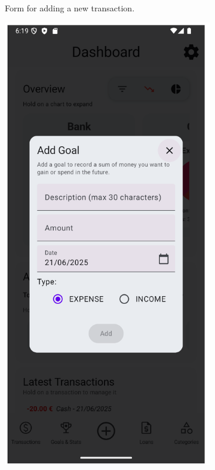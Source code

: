 \documentclass[a4paper,12pt]{article}
\begin{document}
\begin{figure}[H]
\begin{subfigure}[b]{0.23\textwidth}
        \caption{Form for adding a new transaction.}
        \label{fig:add_transaction_form}
    \end{subfigure}
    \hfill
    \begin{subfigure}[b]{0.23\textwidth}
        \includegraphics[width=\textwidth]{add_goal_dialog.png}

\end{subfigure}
\end{figure}
\end{document}
